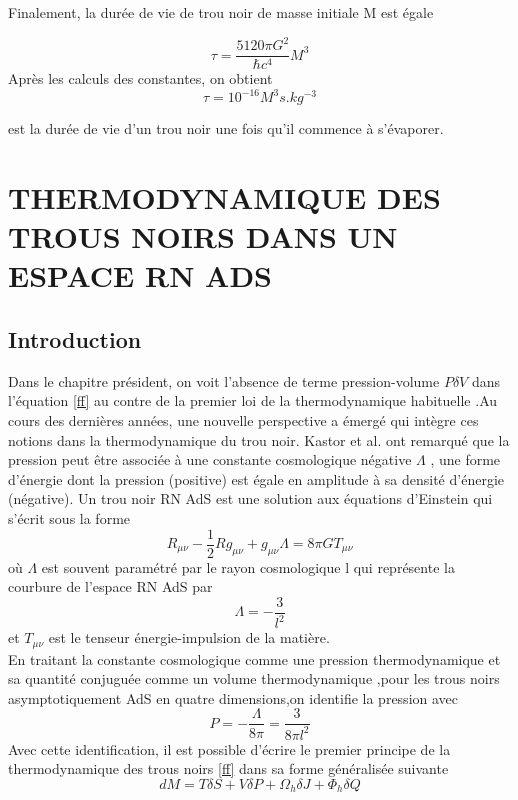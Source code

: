 \documentclass[12pt,  a4paper, openright]{report} %
\begin{document}
Finalement, la durée de vie de trou noir de masse initiale M est égale

\begin{equation}
\tau=\dfrac{5120\pi G^{2}}{\hbar c^{4}}M^{3}
\end{equation}
Après les calculs des constantes, on obtient
\begin{equation}
\tau = 10^{-16}M^{3}s.kg^{-3}
\end{equation}

est la durée de vie d’un trou noir une fois qu’il commence à s’évaporer.

\chapter{THERMODYNAMIQUE DES TROUS NOIRS DANS UN ESPACE RN ADS}
\section*{Introduction}
Dans le chapitre président, on voit l'absence de terme pression-volume $P\delta V$ dans l'équation \ref{ff} au contre de la premier loi de la thermodynamique habituelle .Au cours des dernières années, une nouvelle perspective a émergé qui intègre
ces notions dans la thermodynamique du trou noir. Kastor et al. \cite{16} ont remarqué que la
pression peut être associée à une constante cosmologique négative $\varLambda$ , une forme d’énergie
dont la pression (positive) est égale en amplitude à sa densité d’énergie (négative).
Un trou noir RN AdS est une solution aux équations
d’Einstein qui s’écrit sous la forme
\begin{equation}
R_{\mu\nu}-\dfrac{1}{2}Rg_{\mu\nu}+g_{\mu\nu}\Lambda=8\pi GT_{\mu\nu}
\end{equation}
où $\Lambda$ est souvent paramétré par le rayon cosmologique l qui représente la courbure de
l’espace RN AdS par
\begin{equation}
\Lambda=-\dfrac{3}{l^{2}}
\end{equation}
et $T_{\mu\nu}$ est le tenseur énergie-impulsion de la matière.\\

En traitant la constante cosmologique comme une pression thermodynamique et sa quantité conjuguée comme un volume thermodynamique \cite{16},pour les trous noirs asymptotiquement AdS en quatre dimensions,on identifie la pression avec \cite{16}
\begin{equation}
\label{pre}
P=-\dfrac{\Lambda}{8\pi}=\dfrac{3}{8\pi l^{2}}
\end{equation}
Avec cette identification, il est possible d’écrire le premier principe de la thermodynamique
des trous noirs \ref{ff}  dans sa forme généralisée suivante
\begin{equation}
dM=T\delta S+V\delta P+\Omega_{h}\delta J+\Phi_{h}\delta Q
\end{equation}
\end{document}
